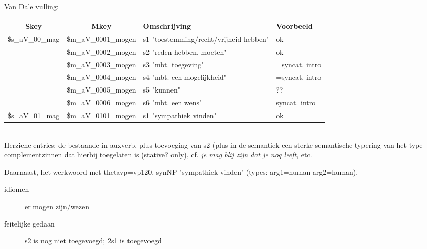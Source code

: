 Van Dale vulling:\\
\begin{tabular}[t]{|c|c|p{}|p{}|}
\hline
Skey          & Mkey              & Omschrijving & Voorbeeld\\
\hline
\$s\_aV\_00\_mag  & \$m\_aV\_0001\_mogen  & s1 "toestemming/recht/vrijheid hebben"&ok\\
              & \$m\_aV\_0002\_mogen  & s2 "reden hebben, moeten"& ok\\
              & \$m\_aV\_0003\_mogen  & s3 "mbt. toegeving"&=syncat. intro\\
              & \$m\_aV\_0004\_mogen  & s4 "mbt. een mogelijkheid"& =syncat. intro\\
              & \$m\_aV\_0005\_mogen  & s5 "kunnen"& ??\\
              & \$m\_aV\_0006\_mogen  & s6 "mbt. een wens"& syncat. intro\\
\$s\_aV\_01\_mag  & \$m\_aV\_0101\_mogen  & s1 "sympathiek vinden" & ok\\
\hline
\end{tabular}\\


Herziene entries: de bestaande in auxverb, plus toevoeging van s2 (plus in de semantiek een sterke semantische typering van
het type complementzinnen dat hierbij toegelaten is (stative? only), cf. {\em je mag blij zijn dat je nog leeft}, etc.

Daarnaast, het werkwoord met thetavp=vp120, synNP "sympathiek vinden" (types: arg1=human-arg2=human).

\begin{description}
  \item[idiomen] er mogen zijn/wezen
\end{description}

\begin{description}
\item[feitelijke gedaan] s2 is nog niet toegevoegd; 2s1 is toegevoegd
\end{description}


\newpage
